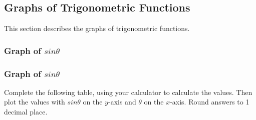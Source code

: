     
    
    
    
    
  
    \label{m39414*cid7}
            \subsection{ Graphs of Trigonometric Functions}
            \nopagebreak
            
      
      \label{m39414*id83471}This section describes the graphs of trigonometric functions.\par 
      \label{m39414*uid30}
            \subsubsection{ Graph of $sin\theta $}
            \nopagebreak
            
        
\label{m39414*secfhsst!!!underscore!!!id1866}
            \subsubsection{  Graph of $sin\theta $ }
            \nopagebreak
             \label{m39414*uid0983}Complete the following table, using your calculator to calculate the values. Then plot the values with \begin{math}sin\theta \end{math} on the \begin{math}y\end{math}-axis and \begin{math}\theta \end{math} on the \begin{math}x\end{math}-axis. Round answers to 1 decimal place.\par 
        
    
